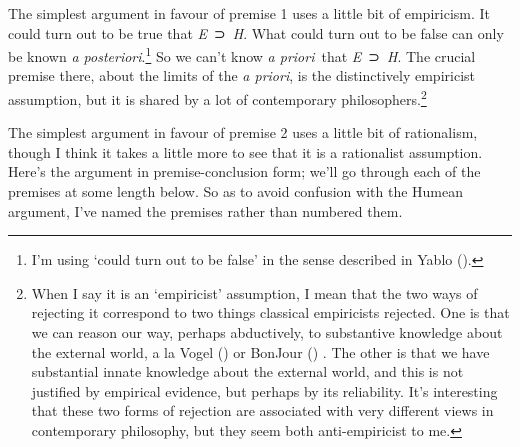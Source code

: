 \documentclass[
  10pt,
  letterpaper,
  DIV=11,
  numbers=noendperiod,
  twoside]{scrartcl}
\begin{document}
The simplest argument in favour of premise 1 uses a little bit of
empiricism. It could turn out to be true that \emph{E}~⊃~\emph{H}. What
could turn out to be false can only be known \emph{a
posteriori}.\footnote{I'm using `could turn out to be false' in the
  sense described in Yablo ().} So we
can't know \emph{a priori}~that \emph{E}~⊃~\emph{H}. The crucial premise
there, about the limits of the \emph{a priori}, is the distinctively
empiricist assumption, but it is shared by a lot of contemporary
philosophers.\footnote{When I say it is an `empiricist' assumption, I
  mean that the two ways of rejecting it correspond to two things
  classical empiricists rejected. One is that we can reason our way,
  perhaps abductively, to substantive knowledge about the external
  world, a la Vogel () or BonJour
  () . The other is that we have
  substantial innate knowledge about the external world, and this is not
  justified by empirical evidence, but perhaps by its reliability. It's
  interesting that these two forms of rejection are associated with very
  different views in contemporary philosophy, but they seem both
  anti-empiricist to me.}

The simplest argument in favour of premise 2 uses a little bit of
rationalism, though I think it takes a little more to see that it is a
rationalist assumption. Here's the argument in premise-conclusion form;
we'll go through each of the premises at some length below. So as to
avoid confusion with the Humean argument, I've named the premises rather
than numbered them.
\end{document}
